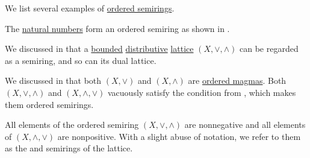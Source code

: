 \begin{example}\label{ex:def:ordered_semiring}
  We list several examples of \hyperref[def:ordered_semirings]{ordered semirings}.

  \begin{thmenum}
     The \hyperref[def:set_of_natural_numbers]{natural numbers} form an ordered semiring as shown in .

     We discussed in  that a \hyperref[def:semilattice/bounded]{bounded} \hyperref[def:semilattice/distributive_lattice]{distributive} \hyperref[def:semilattice/lattice]{lattice} \( (X, \vee, \wedge) \) can be regarded as a semiring, and so can its dual lattice.

    We discussed in  that both \( (X, \vee) \) and \( (X, \wedge) \) are \hyperref[def:ordered_magma]{ordered magmas}. Both \( (X, \vee, \wedge) \) and \( (X, \wedge, \vee) \) vacuously satisfy the condition from , which makes them ordered semirings.

    All elements of the ordered semiring \( (X, \vee, \wedge) \) are nonnegative and all elements of \( (X, \wedge, \vee) \) are nonpositive. With a slight abuse of notation, we refer to them as the  and  semirings of the lattice.
  \end{thmenum}
\end{example}
